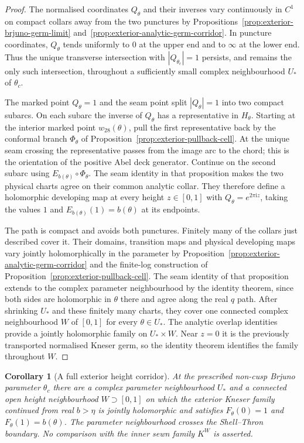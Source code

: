 \documentclass[11pt,a4paper]{article}
\newtheorem{corollary}[theorem]{Corollary}
\theoremstyle{definition}
\newcommand{\Kk}{K}
\newcommand{\ii}{\mathrm{i}}
\begin{document}
\begin{proof}
The normalised coordinates $Q_\theta$ and their inverses vary
continuously in $C^1$ on compact collars away from the two
punctures by Propositions~\ref{prop:exterior-brjuno-germ-limit}
and~\ref{prop:exterior-analytic-germ-corridor}.  In puncture
coordinates, $Q_\theta$ tends uniformly to $0$ at the upper end
and to $\infty$ at the lower end.  Thus the unique transverse
intersection with $|Q_{\theta_c}|=1$ persists, and remains the
only such intersection, throughout a sufficiently small complex
neighbourhood $U_*$ of $\theta_c$.

The marked point $Q_\theta=1$ and the seam point split
$|Q_\theta|=1$ into two compact subarcs.  On each subarc the
inverse of $Q_\theta$ has a representative in $H_\theta$.
Starting at the interior marked point $w_{28}(\theta)$, pull the
first representative back by the conformal branch $\Phi_\theta$ of
Proposition~\ref{prop:exterior-pullback-cell}.  At the unique seam
crossing the representative passes from the image arc to the chord;
this is the orientation of the positive Abel deck generator.
Continue on the second subarc using
$E_{b(\theta)}\circ\Phi_\theta$.  The seam identity in that proposition makes
the two physical charts agree on their common analytic collar.
They therefore define a holomorphic developing map at every height
$z\in[0,1]$ with $Q_\theta=e^{2\pi\ii z}$, taking the values $1$ and
$E_{b(\theta)}(1)=b(\theta)$ at its endpoints.

The path is compact and avoids both punctures.  Finitely many of the
collars just described cover it.  Their domains, transition maps
and physical developing maps vary jointly holomorphically in the
parameter by Proposition~\ref{prop:exterior-analytic-germ-corridor}
and the finite-log construction of
Proposition~\ref{prop:exterior-pullback-cell}.
The seam identity of that proposition extends to the complex
parameter neighbourhood by the identity theorem, since both sides
are holomorphic in $\theta$ there and agree along the real $q$ path.
After shrinking $U_*$ and these finitely many charts, they cover
one connected complex neighbourhood $W$ of $[0,1]$ for every
$\theta\in U_*$.  The analytic overlap identities provide a jointly
holomorphic family on $U_*\times W$.  Near $z=0$ it is the
previously transported normalised Kneser germ, so the identity
theorem identifies the family throughout $W$.
\end{proof}

\begin{corollary}[A full exterior height corridor]
\label{cor:exterior-full-height}
At the prescribed non-cusp Brjuno parameter $\theta_c$ there
are a complex parameter neighbourhood $U_*$ and a connected
open height neighbourhood $W\supset[0,1]$ on which the exterior
Kneser family continued from real $b>\eta$ is jointly holomorphic
and satisfies $F_\theta(0)=1$ and $F_\theta(1)=b(\theta)$.
The parameter neighbourhood crosses the Shell--Thron boundary.
No comparison with the inner sewn family $\Kk^W$ is asserted.
\end{corollary}
\end{document}

